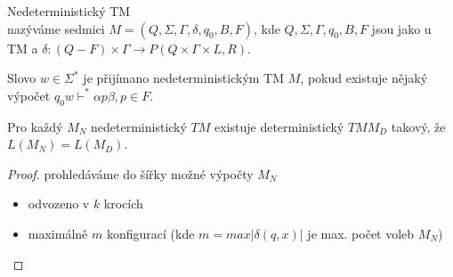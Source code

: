 \documentclass[../main.tex]{subfiles}
\begin{document}
\begin{definition}
    Nedeterministický TM\\
    nazýváme sedmici $M = (Q,\Sigma,\Gamma,\delta,q_0,B,F)$, kde $Q,\Sigma,\Gamma,q_0,B,F$ jsou jako u TM a 
    $\delta : (Q-F)\times \Gamma \rightarrow P(Q\times \Gamma \times {L,R})$.

    Slovo $w \in \Sigma^*$ je přijímano nedeterministickým TM $M$, pokud existuje nějaký výpočet $q_0w\vdash^*\alpha p \beta, p \in F$.
\end{definition}
\begin{theorem}
    Pro každý $M_N$ nedeterministický $TM$ existuje deterministický $TM M_D$ takový, že $L(M_N) = L(M_D)$.
    \begin{proof}
        prohledáváme do šířky možné výpočty $M_N$
        \begin{itemize}
            \item odvozeno v $k$ krocích
            \item maximálně $m$ konfigurací (kde $m = max|\delta(q,x)|$ je max. počet voleb $M_N$)
        \end{itemize}
    \end{proof} 
\end{theorem}
\end{document}
